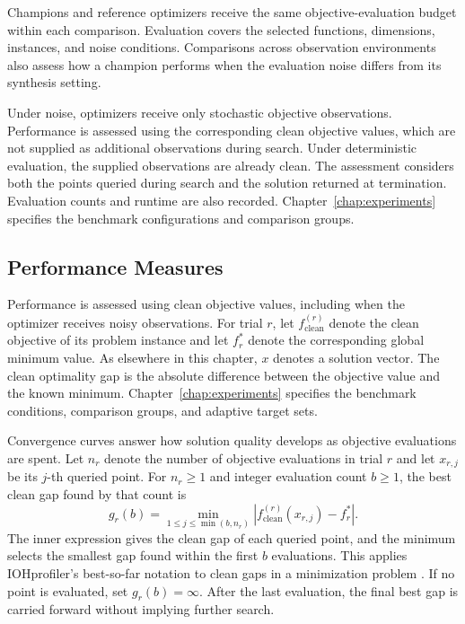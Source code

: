 Champions and reference optimizers receive the same objective-evaluation
budget within each comparison. Evaluation covers the selected functions,
dimensions, instances, and noise conditions. Comparisons across observation
environments also assess how a champion performs when the evaluation noise
differs from its synthesis setting.

Under noise, optimizers receive only stochastic objective observations.
Performance is assessed using the corresponding clean objective values,
which are not supplied as additional observations during search. Under
deterministic evaluation, the supplied observations are already clean. The assessment considers both
the points queried during search and the solution returned at termination.
Evaluation counts and runtime are also recorded.
Chapter~\ref{chap:experiments} specifies the benchmark configurations and
comparison groups.

\subsection{Performance Measures}
\label{subsec:benchmark_performance_measures}

Performance is assessed using clean objective values, including when the
optimizer receives noisy observations. For trial $r$, let
$f_{\mathrm{clean}}^{(r)}$ denote the clean objective of its problem
instance and let $f_r^*$ denote the corresponding global minimum value.
As elsewhere in this chapter, $x$ denotes a solution vector. The clean
optimality gap is the absolute difference between the objective value and
the known minimum. Chapter~\ref{chap:experiments} specifies the benchmark
conditions, comparison groups, and adaptive target sets.

Convergence curves answer how solution quality develops as objective
evaluations are spent. Let $n_r$ denote the number of objective evaluations
in trial $r$ and let $x_{r,j}$ be its $j$-th queried point. For
$n_r\geq1$ and integer evaluation count $b\geq1$, the best clean gap
found by that count is
\begin{equation}
    g_r(b)
    =
    \min_{1\leq j\leq\min(b,n_r)}
    \left|
        f_{\mathrm{clean}}^{(r)}(x_{r,j})-f_r^*
    \right|.
    \label{eq:benchmark_query_convergence}
\end{equation}
The inner expression gives the clean gap of each queried point, and the
minimum selects the smallest gap found within the first $b$ evaluations.
This applies IOHprofiler's best-so-far notation to clean gaps in a
minimization problem \cite[Sec.~4.1]{Doerr2018IOHprofiler}.
If no point is evaluated, set $g_r(b)=\infty$. After the last evaluation,
the final best gap is carried forward without implying further search.

